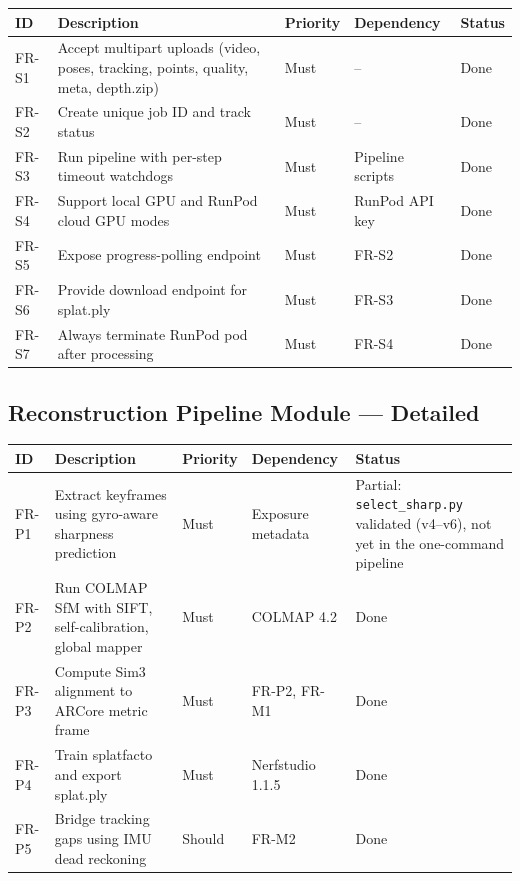 \begin{longtable}{p{}p{}p{}p{}p{}}
\toprule
\textbf{ID} & \textbf{Description} & \textbf{Priority} & \textbf{Dependency} & \textbf{Status} \\
\midrule
FR-S1 & Accept multipart uploads (video, poses, tracking, points, quality, meta, depth.zip) & Must & -- & Done \\
FR-S2 & Create unique job ID and track status & Must & -- & Done \\
FR-S3 & Run pipeline with per-step timeout watchdogs & Must & Pipeline scripts & Done \\
FR-S4 & Support local GPU and RunPod cloud GPU modes & Must & RunPod API key & Done \\
FR-S5 & Expose progress-polling endpoint & Must & FR-S2 & Done \\
FR-S6 & Provide download endpoint for splat.ply & Must & FR-S3 & Done \\
FR-S7 & Always terminate RunPod pod after processing & Must & FR-S4 & Done \\
\bottomrule
\end{longtable}

\subsection{Reconstruction Pipeline Module --- Detailed}

\begin{longtable}{p{}p{}p{}p{}p{}}
\toprule
\textbf{ID} & \textbf{Description} & \textbf{Priority} & \textbf{Dependency} & \textbf{Status} \\
\midrule
FR-P1 & Extract keyframes using gyro-aware sharpness prediction & Must & Exposure metadata & Partial: \texttt{select\_sharp.py} validated (v4--v6), not yet in the one-command pipeline \\
FR-P2 & Run COLMAP SfM with SIFT, self-calibration, global mapper & Must & COLMAP 4.2 & Done \\
FR-P3 & Compute Sim3 alignment to ARCore metric frame & Must & FR-P2, FR-M1 & Done \\
FR-P4 & Train splatfacto and export splat.ply & Must & Nerfstudio 1.1.5 & Done \\
FR-P5 & Bridge tracking gaps using IMU dead reckoning & Should & FR-M2 & Done \\
\bottomrule
\end{longtable}

